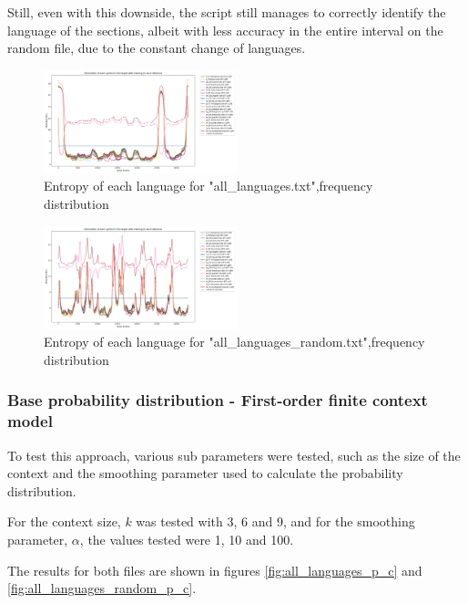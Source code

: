 \documentclass{article}
\begin{document}
Still, even with this downside, the script still manages to correctly identify the language of the sections, albeit with less accuracy in the entire interval on the random file,
due to the constant change of languages.

\begin{figure}
    \centering
    \includegraphics[width=0.5\textwidth]{../results/all_languages/-p_f.png}
    \caption{Entropy of each language for "all_languages.txt",frequency distribution}
    \label{fig:all_languages_p_f}
\end{figure}

\begin{figure}
    \centering
    \includegraphics[width=0.5\textwidth]{../results/all_languages_random/-p_f.png}
    \caption{Entropy of each language for "all_languages_random.txt",frequency distribution}
    \label{fig:all_languages_random_p_f}
\end{figure}

\subsubsection{Base probability distribution - First-order finite context model}
\label{subsubsec:results_locate_lang_first_order_fcm}

To test this approach, various sub parameters were tested, such as the size of the context and the smoothing parameter used to calculate the probability distribution.

For the context size, $k$ was tested with 3, 6 and 9, and for the smoothing parameter, $\alpha$, the values tested were 1, 10 and 100.

The results for both files are shown in figures \ref{fig:all_languages_p_c} and \ref{fig:all_languages_random_p_c}.
\end{document}
